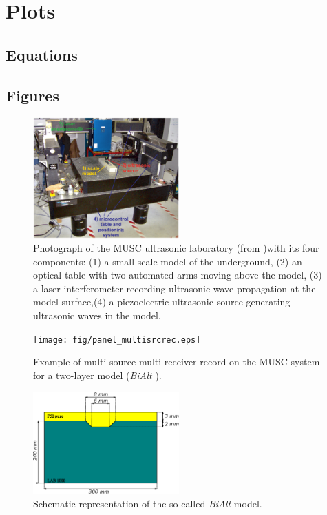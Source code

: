 \documentclass[manuscript,revised]{geophysics}
\newcommand{\bialt}{\textit{BiAlt} }
\begin{document}
\section{Plots}

\subsection*{Equations}

\subsection*{Figures}

\begin{figure}[!h]
	\centering
	\includegraphics[width=0.5\textwidth]{fig/panel_musc_bench.eps}
	\caption{Photograph of the MUSC ultrasonic laboratory (from \citet{Bretaudeau_FWI_2013} )with its four components: (1) a small-scale model of the underground, (2) an optical table with two automated arms moving above the model, (3) a laser interferometer recording ultrasonic wave propagation	at the model surface,(4) a piezoelectric ultrasonic source generating ultrasonic waves in the model.}
	\label{panel_musc_bench}
\end{figure}

\begin{figure}[!h]
	\centering
	\texttt{[image: fig/panel\_multisrcrec.eps]}
	\caption{Example of multi-source multi-receiver record on the MUSC system for a two-layer model (\bialt).}
	\label{panel_multisrcrec}
\end{figure}

\begin{figure}[!h]
	\centering
	\includegraphics[width=0.5\textwidth]{fig/bialt_model.eps}
	\caption{Schematic representation of the so-called \bialt model.}
	\label{panel_bialt_model}
\end{figure}
\end{document}
